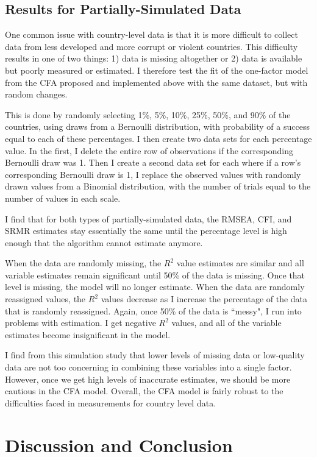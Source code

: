 \documentclass[letterpaper,11pt]{article}
\begin{document}
\subsection{Results for Partially-Simulated Data}

One common issue with country-level data is that it is more difficult to collect data from less developed and more corrupt or violent countries. This difficulty results in one of two things: 1) data is missing altogether or 2) data is available but poorly measured or estimated. I therefore test the fit of the one-factor model from the CFA proposed and implemented above with the same dataset, but with random changes. 

This is done by randomly selecting 1\%, 5\%, 10\%, 25\%, 50\%, and 90\% of the countries, using draws from a Bernoulli distribution, with probability of a success equal to each of these percentages. I then create two data sets for each percentage value. In the first, I delete the entire row of observations if the corresponding Bernoulli draw was 1. Then I create a second data set for each where if a row's corresponding Bernoulli draw is 1, I replace the observed values with randomly drawn values from a Binomial distribution, with the number of trials equal to the number of values in each scale.

I find that for both types of partially-simulated data, the RMSEA, CFI, and SRMR estimates stay essentially the same until the percentage level is high enough that the algorithm cannot estimate anymore.

When the data are randomly missing, the $R^2$ value estimates are similar and all variable estimates remain significant until 50\% of the data is missing. Once that level is missing, the model will no longer estimate. When the data are randomly reassigned values, the $R^2$ values decrease as I increase the percentage of the data that is randomly reassigned. Again, once 50\% of the data is ``messy", I run into problems with estimation. I get negative $R^2$ values, and all of the variable estimates become insignificant in the model. 

I find from this simulation study that lower levels of missing data or low-quality data are not too concerning in combining these variables into a single factor. However, once we get high levels of inaccurate estimates, we should be more cautious in the CFA model. Overall, the CFA model is fairly robust to the difficulties faced in measurements for country level data.

\section{Discussion and Conclusion}
\end{document}
